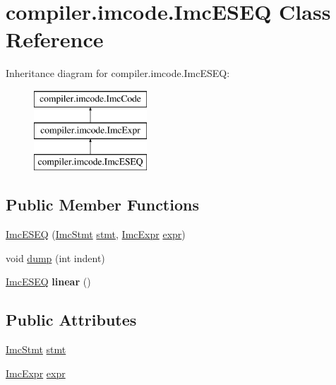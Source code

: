 \hypertarget{classcompiler_1_1imcode_1_1_imc_e_s_e_q}{}\section{compiler.\+imcode.\+Imc\+E\+S\+EQ Class Reference}
\label{classcompiler_1_1imcode_1_1_imc_e_s_e_q}
Inheritance diagram for compiler.\+imcode.\+Imc\+E\+S\+EQ\+:\begin{figure}[H]
\begin{center}
\leavevmode
\includegraphics[height=3.000000cm]{classcompiler_1_1imcode_1_1_imc_e_s_e_q}
\end{center}
\end{figure}
\subsection*{Public Member Functions}
\begin{DoxyCompactItemize}
\item 
\hyperlink{classcompiler_1_1imcode_1_1_imc_e_s_e_q_ab097c7cd279ab955115518e8d19181a6}{Imc\+E\+S\+EQ} (\hyperlink{classcompiler_1_1imcode_1_1_imc_stmt}{Imc\+Stmt} \hyperlink{classcompiler_1_1imcode_1_1_imc_e_s_e_q_afb69f3ce55e9a9990f3ae53028eef7a4}{stmt}, \hyperlink{classcompiler_1_1imcode_1_1_imc_expr}{Imc\+Expr} \hyperlink{classcompiler_1_1imcode_1_1_imc_e_s_e_q_a5a738c2d0d2b3c8f75acb4dc718bc9cd}{expr})
\item 
void \hyperlink{classcompiler_1_1imcode_1_1_imc_e_s_e_q_ae7ffd559e60c89d8e1d39cd0bab8df66}{dump} (int indent)
\item 
\mbox{\label{classcompiler_1_1imcode_1_1_imc_e_s_e_q_aa50f0f3b382dd0be781263ce59358b51}} 
\hyperlink{classcompiler_1_1imcode_1_1_imc_e_s_e_q}{Imc\+E\+S\+EQ} {\bfseries linear} ()
\end{DoxyCompactItemize}
\subsection*{Public Attributes}
\begin{DoxyCompactItemize}
\item 
\hyperlink{classcompiler_1_1imcode_1_1_imc_stmt}{Imc\+Stmt} \hyperlink{classcompiler_1_1imcode_1_1_imc_e_s_e_q_afb69f3ce55e9a9990f3ae53028eef7a4}{stmt}
\item 
\hyperlink{classcompiler_1_1imcode_1_1_imc_expr}{Imc\+Expr} \hyperlink{classcompiler_1_1imcode_1_1_imc_e_s_e_q_a5a738c2d0d2b3c8f75acb4dc718bc9cd}{expr}
\end{DoxyCompactItemize}


